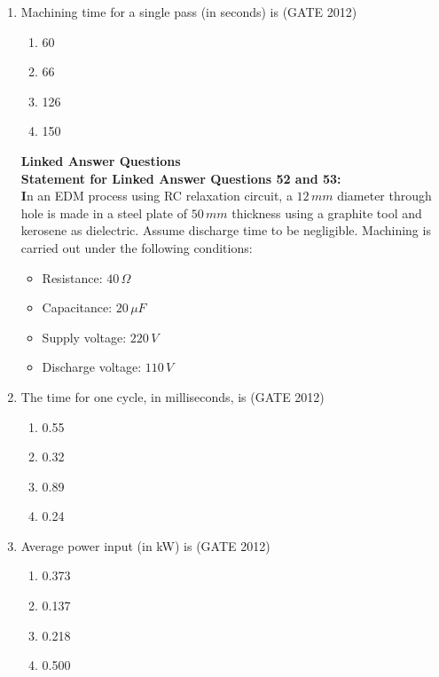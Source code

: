 \documentclass[journal,12pt,onecolumn]{IEEEtran}
\theoremstyle{remark}
\begin{document}
\begin{enumerate}
\item Machining time for a single pass (in seconds) is  
\hfill{(GATE 2012)}

\begin{enumerate}
\item 60
\item 66
\item 126
\item 150
\end{enumerate}
\vspace{1cm}


\textbf{Linked Answer Questions }\\
\textbf{Statement for Linked Answer Questions 52 and 53:    }\\
\textbf In an EDM process using RC relaxation circuit, a $12 \, mm$ diameter through hole is made in a steel plate of $50 \, mm$ thickness using a graphite tool and kerosene as dielectric. Assume discharge time to be negligible. Machining is carried out under the following conditions:
\begin{itemize}
  \item Resistance: $40 \, \Omega$
  \item Capacitance: $20 \, \mu F$
  \item Supply voltage: $220 \, V$
  \item Discharge voltage: $110 \, V$
\end{itemize}

\item The time for one cycle, in milliseconds, is  
\hfill{(GATE 2012)}

\begin{enumerate}
\item 0.55
\item 0.32
\item 0.89
\item 0.24
\end{enumerate}
\vspace{1cm}

\item Average power input (in kW) is  
\hfill{(GATE 2012)}

\begin{enumerate}
\item 0.373
\item 0.137
\item 0.218
\item 0.500
\end{enumerate}
\vspace{1cm}


\end{enumerate}
\end{document}
